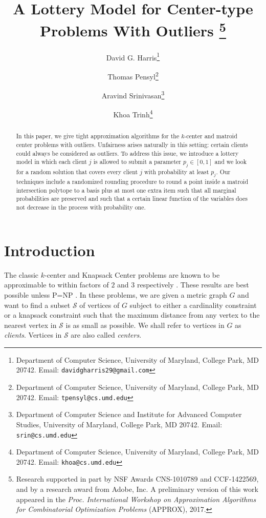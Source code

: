 \documentclass[a4paper,11pt]{article}
\renewcommand{\S}{\mathcal{S}}
\begin{document}
\title{A Lottery Model for Center-type Problems With Outliers \thanks{Research supported in part by NSF Awards CNS-1010789 and CCF-1422569, and by a research award from Adobe, Inc.  A preliminary version of this work appeared in the \emph{Proc. International Workshop on Approximation Algorithms for Combinatorial Optimization Problems} (APPROX), 2017.}}

\author{  
David G. Harris\thanks{Department of Computer Science, University of Maryland,
College Park, MD 20742. Email:
\texttt{davidgharris29@gmail.com}}
\and
Thomas Pensyl\thanks{Department of Computer Science, University of Maryland, College Park, MD 20742. Email: \texttt{tpensyl@cs.umd.edu}}
\and
Aravind Srinivasan\thanks{Department of Computer Science and Institute for Advanced Computer Studies, University of Maryland, College Park, MD 20742.  Email: 
\texttt{srin@cs.umd.edu}} 
\and Khoa Trinh\thanks{Department of Computer Science, University of Maryland, College Park, MD 20742. Email: \texttt{khoa@cs.umd.edu}}}


\date{}
\maketitle
\begin{abstract}
In this paper, we give tight approximation algorithms for the $k$-center and matroid center problems with outliers. Unfairness arises naturally in this setting: certain clients could always be considered as outliers. To address this issue, we introduce a lottery model in which each client $j$ is allowed to submit a parameter $p_j \in [0,1]$ and we look for a random solution that covers every client $j$ with probability at least $p_j$. Our techniques include a randomized rounding procedure to round a point inside a matroid intersection polytope to a basis plus at most one extra item such that all marginal probabilities are preserved and such that a certain linear function of the variables does not decrease in the process with probability one. 
\end{abstract}

\section{Introduction}

The classic $k$-center and Knapsack Center problems are known to be approximable to within factors of $2$ and $3$ respectively \cite{hoch_shmoys_kc}. These results are best possible unless P=NP \cite{Hsu, hoch_shmoys_kc}. In these problems, we are given a metric graph $G$ and want to find a subset $\S$ of vertices of $G$ subject to either a cardinality constraint or a knapsack constraint such that the maximum distance from any vertex to the nearest vertex in $\S$ is as small as possible. We shall refer to vertices in $G$ as \emph{clients}. Vertices in $\S$ are also called \emph{centers}.
\end{document}
